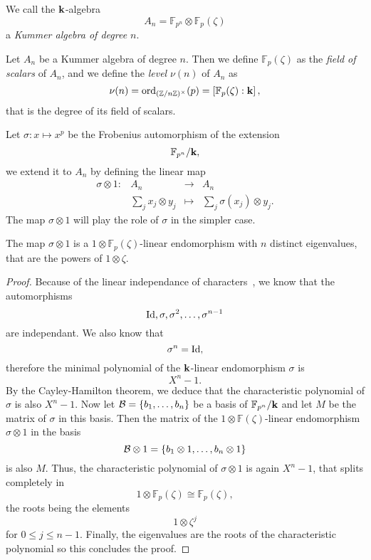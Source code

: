 \begin{defi}
 We call the $\mathbf{k}$-algebra
 \[
   A_n = \mathbb{F}_{p^n}\otimes\mathbb{F}_{p}(\zeta)
 \]
 a \emph{Kummer algebra of degree $n$}.
\end{defi}
\begin{defi}
  Let $A_n$ be a Kummer algebra of degree $n$. Then we define
  $\mathbb{F}_{p}(\zeta)$ as the \emph{field of scalars} of $A_n$, and we
  define the \emph{level} $\nu(n)$ of $A_n$ as
  \[
    \nu(n) = \mathrm{ord}_{(\mathbb{Z}/n\mathbb{Z})^\times}(p) = \left[
      \mathbb{F}_{p}(\zeta):\mathbf{k} \right],
  \]
  that is the degree of its field of scalars.
\end{defi}
Let $\sigma:x\mapsto x^p$ be the Frobenius automorphism of the extension
\[
  \mathbb{F}_{p^n}/\mathbf{k},
\]
we extend it to $A_n$ by defining the linear map
\[
  \begin{array}{cccc}
    \sigma\otimes 1: & A_n & \to & A_n\\
    & \sum_j x_j\otimes y_j & \mapsto & \sum_j \sigma(x_j) \otimes y_j.
  \end{array}
\]
The map $\sigma\otimes 1$ will play the role of $\sigma$ in the simpler case.
\begin{lm}
  The map $\sigma\otimes1$ is a $1\otimes\mathbb{F}_{p}(\zeta)$-linear
  endomorphism with $n$ distinct eigenvalues, that are the powers of
  $1\otimes\zeta$.
\end{lm}
\begin{proof}
  Because of the linear independance of characters~\cite[Chapter VI,
  §4]{Lang04}, we know that the automorphisms
  \[
    \operatorname{Id}, \sigma, \sigma^2, \dots, \sigma^{n-1}
  \]
  are independant. We also know that 
  \[
    \sigma^n = \operatorname{Id},
  \]
  therefore the minimal polynomial of the $\mathbf{k}$-linear endomorphism $\sigma$ is
  \[
    X^n-1.
  \]
  By the Cayley-Hamilton theorem, we deduce that the characteristic
  polynomial of $\sigma$ is also $X^n-1$. Now let $\mathcal{B}=\left\{ b_1, \dots, b_n \right\}$ be a basis of
  $\mathbb{F}_{p^n}/\mathbf{k}$ and let $M$ be the matrix of $\sigma$ in this basis.
  Then the matrix of the $1\otimes\mathbb{F}(\zeta)$-linear endomorphism
  $\sigma\otimes1$ in the basis
  \[
    \mathcal{B}\otimes 1 =\left\{ b_1\otimes1, \dots, b_n\otimes1 \right\}
  \]
  is also $M$. Thus, the characteristic polynomial of $\sigma\otimes1$ is again
  $X^n-1$, that splits completely in 
  \[
    1\otimes\mathbb{F}_{p}(\zeta)\cong \mathbb{F}_{p}(\zeta),
  \]
  the roots being the elements
  \[
    1\otimes\zeta^j
  \]
  for $0\leq j\leq n-1$. Finally, the eigenvalues are the roots of the
  characteristic polynomial so this concludes the proof.
\end{proof}
